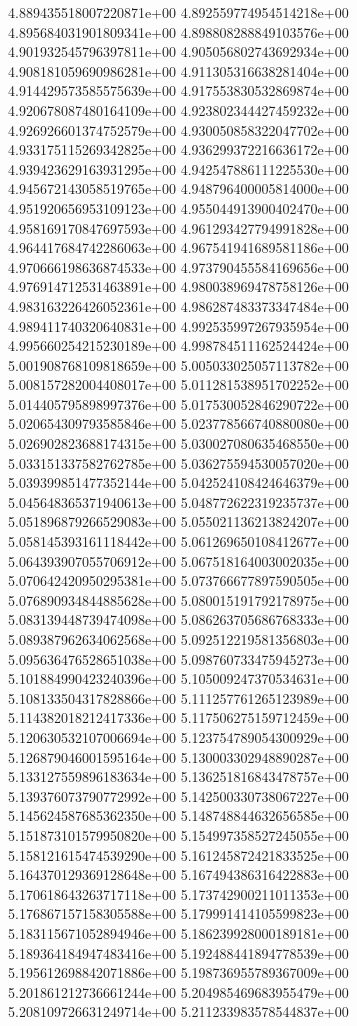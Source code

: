 4.889435518007220871e+00
4.892559774954514218e+00
4.895684031901809341e+00
4.898808288849103576e+00
4.901932545796397811e+00
4.905056802743692934e+00
4.908181059690986281e+00
4.911305316638281404e+00
4.914429573585575639e+00
4.917553830532869874e+00
4.920678087480164109e+00
4.923802344427459232e+00
4.926926601374752579e+00
4.930050858322047702e+00
4.933175115269342825e+00
4.936299372216636172e+00
4.939423629163931295e+00
4.942547886111225530e+00
4.945672143058519765e+00
4.948796400005814000e+00
4.951920656953109123e+00
4.955044913900402470e+00
4.958169170847697593e+00
4.961293427794991828e+00
4.964417684742286063e+00
4.967541941689581186e+00
4.970666198636874533e+00
4.973790455584169656e+00
4.976914712531463891e+00
4.980038969478758126e+00
4.983163226426052361e+00
4.986287483373347484e+00
4.989411740320640831e+00
4.992535997267935954e+00
4.995660254215230189e+00
4.998784511162524424e+00
5.001908768109818659e+00
5.005033025057113782e+00
5.008157282004408017e+00
5.011281538951702252e+00
5.014405795898997376e+00
5.017530052846290722e+00
5.020654309793585846e+00
5.023778566740880080e+00
5.026902823688174315e+00
5.030027080635468550e+00
5.033151337582762785e+00
5.036275594530057020e+00
5.039399851477352144e+00
5.042524108424646379e+00
5.045648365371940613e+00
5.048772622319235737e+00
5.051896879266529083e+00
5.055021136213824207e+00
5.058145393161118442e+00
5.061269650108412677e+00
5.064393907055706912e+00
5.067518164003002035e+00
5.070642420950295381e+00
5.073766677897590505e+00
5.076890934844885628e+00
5.080015191792178975e+00
5.083139448739474098e+00
5.086263705686768333e+00
5.089387962634062568e+00
5.092512219581356803e+00
5.095636476528651038e+00
5.098760733475945273e+00
5.101884990423240396e+00
5.105009247370534631e+00
5.108133504317828866e+00
5.111257761265123989e+00
5.114382018212417336e+00
5.117506275159712459e+00
5.120630532107006694e+00
5.123754789054300929e+00
5.126879046001595164e+00
5.130003302948890287e+00
5.133127559896183634e+00
5.136251816843478757e+00
5.139376073790772992e+00
5.142500330738067227e+00
5.145624587685362350e+00
5.148748844632656585e+00
5.151873101579950820e+00
5.154997358527245055e+00
5.158121615474539290e+00
5.161245872421833525e+00
5.164370129369128648e+00
5.167494386316422883e+00
5.170618643263717118e+00
5.173742900211011353e+00
5.176867157158305588e+00
5.179991414105599823e+00
5.183115671052894946e+00
5.186239928000189181e+00
5.189364184947483416e+00
5.192488441894778539e+00
5.195612698842071886e+00
5.198736955789367009e+00
5.201861212736661244e+00
5.204985469683955479e+00
5.208109726631249714e+00
5.211233983578544837e+00
